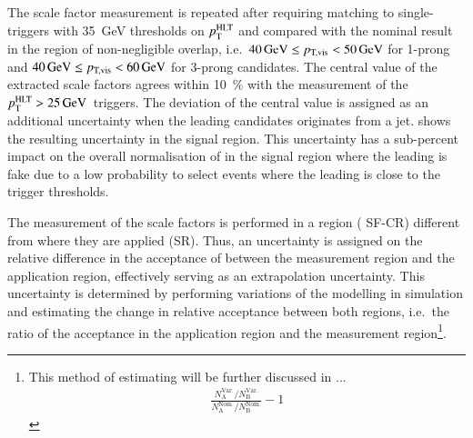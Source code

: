 The scale factor measurement is repeated after requiring matching to
single-\tauhadvis triggers with \SI{35}{\GeV} thresholds on $p_{\text{T}}^{\text{HLT}}$
and compared with the nominal result in the region of non-negligible
overlap, i.e.\ $\SI{40}{\ensuremath{\text{GeV}}} \leq p_\text{T,vis} < \SI{50}{\ensuremath{\text{GeV}}}$ for 1-prong
and $\SI{40}{\ensuremath{\text{GeV}}} \leq p_\text{T,vis} < \SI{60}{\ensuremath{\text{GeV}}}$ for 3-prong
candidates. The central value of the extracted scale factors agrees
within \SI{10}{\percent} with the measurement of the
$\pTHLT > \SI{25}{\GeV}$~triggers. The deviation of the central value
is assigned as an additional uncertainty when the leading \tauhadvis
candidates originates from a
jet.  shows the resulting
uncertainty in the \hadhad signal region. This uncertainty has a sub-percent impact on the overall
normalisation of \ttbar in the signal region where the leading
\tauhadvis is fake due to a low probability to select events where the
leading \tauhadvis is close to the trigger thresholds.


\begin{table}[htbp]
  \centering

  

  \caption{Uncertainty based on the comparison of scale factors
    measured for triggers with $\pTHLT > \SI{25}{\GeV}$ and
    $\pTHLT > \SI{35}{\GeV}$. The impact on the normalisation of
    \ttbar with a leading \tauhadvis candidate originating from jets
    and \pTvis close to the threshold of \SI{40}{\GeV} is shown.}
  \label{tab:ttbarSF_tau25_35_uncertainty}
\end{table}

The measurement of the scale factors is performed in a region (\lephad
SF-CR) different from where they are applied (\hadhad SR). Thus, an
uncertainty is assigned on the relative difference in the acceptance
of \ttbarFakes between the measurement region and the application
region, effectively serving as an extrapolation uncertainty. This
uncertainty is determined by performing variations of the \ttbar
modelling in simulation and estimating the change in relative
acceptance between both regions, i.e.\ the ratio of the acceptance in
the application region and the measurement region\footnote{This method
  of estimating will be further discussed in ...
  \begin{align*}
    \frac{N_\text{A}^\text{Var.} / N_\text{B}^\text{Var.}}{N_\text{A}^\text{Nom.} / N_\text{B}^\text{Nom.}} - 1
  \end{align*}
}.

